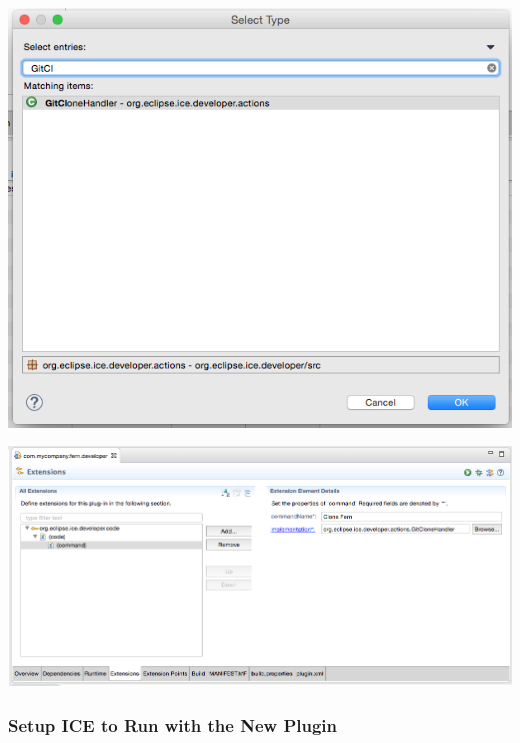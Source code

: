 \documentclass{article}
\begin{document}
\begin{center}
\includegraphics[width=\textwidth]{figures/extptconfig3.png}
\label{fig:config3}
\end{center}

\begin{center}
\includegraphics[width=\textwidth]{figures/extptconfig4.png}
\label{fig:config4}
\end{center}

\subsubsection{Setup ICE to Run with the New Plugin}
\end{document}
